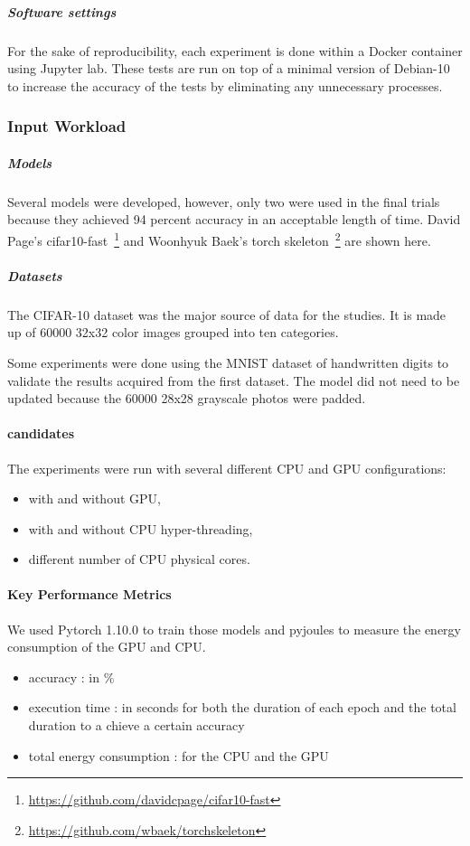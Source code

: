 \subparagraph{Software settings}
For the sake of reproducibility, each experiment is done within a Docker container using Jupyter lab. These tests are run on top of a minimal version of Debian-10 to increase the accuracy of the tests by eliminating any unnecessary processes.
\subsubsection{Input Workload}
\subparagraph{Models}
Several models were developed, however, only two were used in the final trials because they achieved 94 percent accuracy in an acceptable length of time.
David Page's cifar10-fast~\footnote{\url{https://github.com/davidcpage/cifar10-fast}} and Woonhyuk Baek's torch skeleton~\footnote{\url{https://github.com/wbaek/torchskeleton}} are shown here.

\subparagraph{Datasets}
The CIFAR-10 dataset was the major source of data for the studies.
It is made up of 60000 32x32 color images grouped into ten categories.

Some experiments were done using the MNIST dataset of handwritten digits to validate the results acquired from the first dataset.
The model did not need to be updated because the 60000 28x28 grayscale photos were padded.


\paragraph{candidates}
The experiments were run with several different CPU and GPU configurations:
\begin{itemize}
    \item with and without GPU,
    \item with and without CPU hyper-threading,
    \item different number of CPU physical cores.
\end{itemize}

\paragraph{Key Performance Metrics}
We used Pytorch 1.10.0 to train those models and pyjoules to measure the energy consumption of the GPU and CPU.
\begin{itemize}
    \item accuracy : in \%
    \item execution time : in seconds for both the duration of each epoch and the total duration to a chieve a certain accuracy
    \item total energy consumption : for the CPU and the  GPU
\end{itemize}


